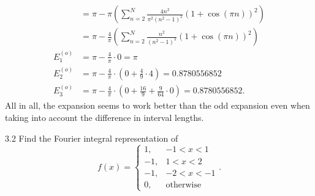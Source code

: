 \begin{derivation}
\begin{enumerate}[label=\alph*)]
\begin{align*}
      &= \pi - \pi \left( \sum_{n = 2}^{N} \frac{4n^2}{\pi^2 \left( n^2 - 1 \right)^2} \left( 1 + \cos(\pi n) \right)^2 \right) \\
      &= \pi - \frac{4}{\pi} \left( \sum_{n = 2}^{N} \frac{n^2}{\left( n^2 - 1 \right)^2} \left( 1 + \cos(\pi n) \right)^2 \right) \\
      E_1^{(o)} &= \pi - \frac{4}{\pi} \cdot 0 = \pi \\
      E_2^{(o)} &= \pi - \frac{4}{\pi} \cdot \left( 0 + \frac{4}{9} \cdot 4 \right) = \num{0,8780556852}  \\
      E_3^{(o)} &= \pi - \frac{4}{\pi} \cdot \left( 0 + \frac{16}{9} + \frac{9}{64} \cdot 0 \right) = \num{0,8780556852} 
    .\end{align*}
    All in all, the expansion seems to work better than the odd expansion even when taking into account the difference in interval lengths.
  \end{enumerate}
\end{derivation}



\begin{problem}{3.2}
Find the Fourier integral representation of
\[ 
f(x) = \begin{cases}
  1, & -1 < x < 1 \\
  -1, & 1 < x < 2 \\
  -1, & -2 < x < -1 \\
   0, & \text{otherwise}
\end{cases}
.\]
\end{problem}

